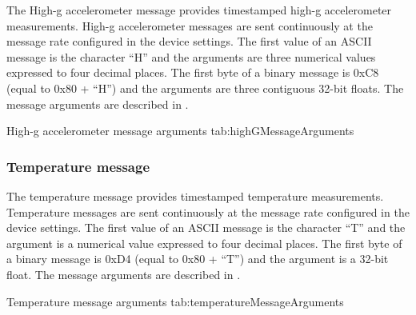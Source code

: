 The High-g accelerometer message provides timestamped high-g accelerometer measurements.  High-g accelerometer messages are sent continuously at the message rate configured in the device settings.  The first value of an \ac{ASCII} message is the character \enquote{H} and the arguments are three numerical values expressed to four decimal places.  The first byte of a binary message is 0xC8 (equal to 0x80 + \enquote{H}) and the arguments are three contiguous 32-bit floats.  The message arguments are described in .

\begingroup
    \def\tempArgumentA{High-g accelerometer X axis in g}
    \def\tempArgumentB{High-g accelerometer Y axis in g}
    \def\tempArgumentC{High-g accelerometer Z axis in g}
    \dataMessageTable
    {High-g accelerometer message arguments}
    {tab:highGMessageArguments}
\endgroup

\begingroup
    \def\tempNameA{High-g accelerometer X axis}
    \def\tempNameB{High-g accelerometer Y axis}
    \def\tempNameC{High-g accelerometer Z axis}
    \def\tempValueA{0}
    \def\tempValueB{0}
    \def\tempValueC{1}
    \def\tempAsciiFirst{H}
    \def\tempAsciiA{0.0000}
    \def\tempAsciiB{0.0000}
    \def\tempAsciiC{1.0000}
    \def\tempBinaryFirst{C8}
    \def\tempBinaryA{00 00 00 00}
    \def\tempBinaryB{00 00 00 00}
    \def\tempBinaryC{00 00 80 3F}
    \dataMessageExample
\endgroup

\subsubsection{Temperature message}

The temperature message provides timestamped temperature measurements.  Temperature messages are sent continuously at the message rate configured in the device settings.  The first value of an \ac{ASCII} message is the character \enquote{T} and the argument is a numerical value expressed to four decimal places.  The first byte of a binary message is 0xD4 (equal to 0x80 + \enquote{T}) and the argument is a 32-bit float.  The message arguments are described in .

\begingroup
    \def\tempArgumentA{Temperature in degrees Celsius}
    \dataMessageTable
    {Temperature message arguments}
    {tab:temperatureMessageArguments}
\endgroup

\begingroup
    \def\tempNameA{Temperature}
    \def\tempValueA{25}
    \def\tempAsciiFirst{T}
    \def\tempAsciiA{25.0000}
    \def\tempBinaryFirst{D4}
    \def\tempBinaryA{00 00 41 C8}
    \dataMessageExample
\endgroup

